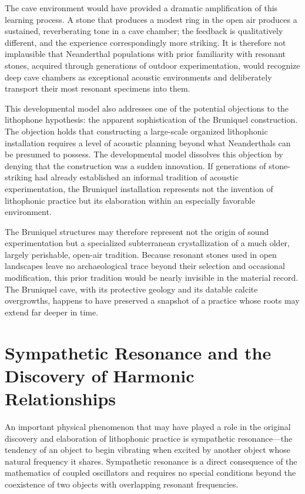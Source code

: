 \documentclass[12pt]{article}
\begin{document}
The cave environment would have provided a dramatic amplification of this learning process. A stone that produces a modest ring in the open air produces a sustained, reverberating tone in a cave chamber; the feedback is qualitatively different, and the experience correspondingly more striking. It is therefore not implausible that Neanderthal populations with prior familiarity with resonant stones, acquired through generations of outdoor experimentation, would recognize deep cave chambers as exceptional acoustic environments and deliberately transport their most resonant specimens into them.

This developmental model also addresses one of the potential objections to the lithophone hypothesis: the apparent sophistication of the Bruniquel construction. The objection holds that constructing a large-scale organized lithophonic installation requires a level of acoustic planning beyond what Neanderthals can be presumed to possess. The developmental model dissolves this objection by denying that the construction was a sudden innovation. If generations of stone-striking had already established an informal tradition of acoustic experimentation, the Bruniquel installation represents not the invention of lithophonic practice but its elaboration within an especially favorable environment.

The Bruniquel structures may therefore represent not the origin of sound experimentation but a specialized subterranean crystallization of a much older, largely perishable, open-air tradition. Because resonant stones used in open landscapes leave no archaeological trace beyond their selection and occasional modification, this prior tradition would be nearly invisible in the material record. The Bruniquel cave, with its protective geology and its datable calcite overgrowths, happens to have preserved a snapshot of a practice whose roots may extend far deeper in time.

\section{Sympathetic Resonance and the Discovery of Harmonic Relationships}

An important physical phenomenon that may have played a role in the original discovery and elaboration of lithophonic practice is sympathetic resonance—the tendency of an object to begin vibrating when excited by another object whose natural frequency it shares. Sympathetic resonance is a direct consequence of the mathematics of coupled oscillators and requires no special conditions beyond the coexistence of two objects with overlapping resonant frequencies.
\end{document}
